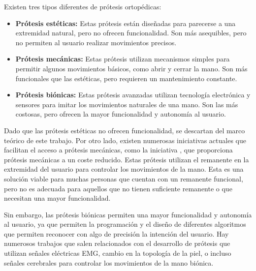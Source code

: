 Existen tres tipos diferentes de prótesis ortopédicas:
\begin{itemize}
    \item \textbf{Prótesis estéticas:} Estas prótesis están diseñadas para parecerse a una extremidad natural, pero no ofrecen funcionalidad. Son más asequibles, pero no permiten al usuario realizar movimientos precisos.
    \item \textbf{Prótesis mecánicas:} Estas prótesis utilizan mecanismos simples para permitir algunos movimientos básicos, como abrir y cerrar la mano. Son más funcionales que las estéticas, pero requieren un mantenimiento constante.
    \item \textbf{Prótesis biónicas:} Estas prótesis avanzadas utilizan tecnología electrónica y sensores para imitar los movimientos naturales de una mano. Son las más costosas, pero ofrecen la mayor funcionalidad y autonomía al usuario.
\end{itemize}

Dado que las prótesis estéticas no ofrecen funcionalidad, se descartan del marco teórico de este trabajo. Por otro lado, existen numerosas iniciativas actuales que facilitan el acceso a prótesis mecánicas, como la iniciativa  \citep{openbionics2018}, que proporciona prótesis mecánicas a un coste reducido. Estas prótesis utilizan el remanente en la extremidad del usuario para controlar los movimientos de la mano. Esta es una solución viable para muchas personas que cuentan con un remanente funcional, pero no es adecuada para aquellos que no tienen suficiente remanente o que necesitan una mayor funcionalidad.



Sin embargo, las prótesis biónicas permiten una mayor funcionalidad y autonomía al usuario, ya que permiten la programación y el diseño de diferentes algoritmos que permiten reconocer con algo de precisión la intención del usuario. Hay numerosos trabajos que salen relacionados con el desarrollo de prótesis que utilizan señales eléctricas EMG, cambio en la topología de la piel, o incluso señales cerebrales para controlar los movimientos de la mano biónica. 


